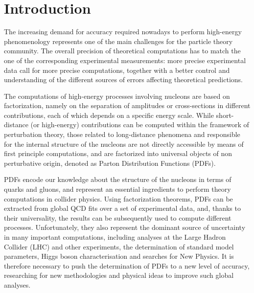 \chapter*{Introduction}
The increasing demand for accuracy required nowadays to perform high-energy phenomenology
represents one of the main challenges for the particle theory community. The
overall precision of theoretical computations has to match the one of the corresponding
experimental measurements: more precise  
experimental data call for more precise computations, together with a better control
and understanding of the different sources of errors affecting theoretical predictions. 

The computations of high-energy processes involving nucleons are based on factorization, namely on the separation
of amplitudes or cross-sections in different contributions, each of which depends on a specific energy scale.
While short-distance (or high-energy) contributions can be computed within the framework of perturbation theory,
those related to long-distance phenomena and responsible for the internal
structure of the nucleons are not directly accessible by means of first principle computations, 
and are factorized into universal objects of non perturbative origin, denoted as Parton Distribution Functions (PDFs).
 
PDFs encode our knowledge about the structure of the nucleons in terms of quarks and
gluons, and represent an essential ingredients to perform theory computations in collider physics.
Using factorization theorems, PDFs can be extracted from global QCD fits
over a set of experimental data, and, thanks to their universality, the results can be subsequently used
to compute different processes. 
Unfortunately, they also represent the dominant source of uncertainty in many important computations,
including analyses at the Large Hadron Collider (LHC) and other experiments,
the determination of standard model parameters, Higgs boson characterisation and searches for New Physics.
It is therefore necessary to push the determination of PDFs to a new level of accuracy,
researching for new methodologies and physical ideas to improve such global analyses.

